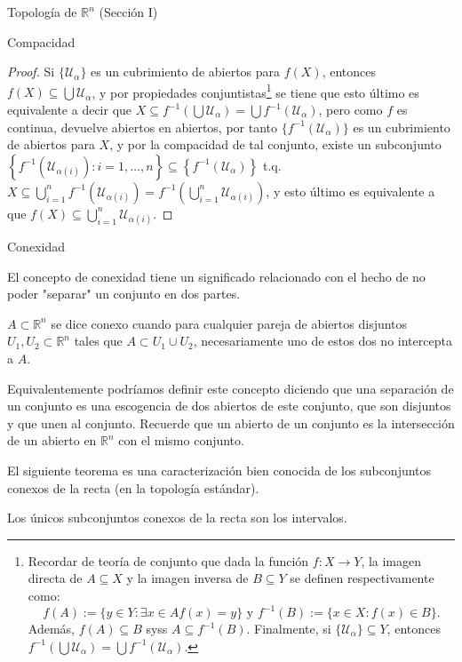 \begin{chapter}{Topología de $\mathbb{R}^n$ (Sección I)}
\begin{section}{Compacidad}
\begin{proof}
Si $\{\mathcal{U}_\alpha\}$ es un cubrimiento de abiertos para $f(X)$, entonces $f(X)\subseteq\bigcup\mathcal{U}_\alpha$, y por propiedades conjuntistas\footnote{Recordar de teoría de conjunto que dada la función $f:X\to Y$, la imagen directa de $A\subseteq X$ y la imagen inversa de $B\subseteq Y$ se definen respectivamente como:$$f(A):=\{y\in Y:\exists x\in A f(x)=y\}\text{ y }f^{-1}(B):=\{x\in X:f(x)\in B\}.$$ Además, $f(A)\subseteq B$ syss $A\subseteq f^{-1}(B)$. Finalmente, si $\{\mathcal{U}_\alpha\}\subseteq Y$, entonces $f^{-1}\left(\bigcup\mathcal{U}_\alpha\right)=\bigcup f^{-1}\left(\mathcal{U}_\alpha\right)$.} se tiene que esto último es equivalente a decir que $X\subseteq f^{-1}\left(\bigcup\mathcal{U}_\alpha\right)=\bigcup f^{-1}(\mathcal{U}_\alpha)$, pero como $f$ es continua, devuelve abiertos en abiertos, por tanto $\{f^{-1}(\mathcal{U}_\alpha)\}$ es un cubrimiento de abiertos para $X$, y por la compacidad de tal conjunto, existe un subconjunto $\left\lbrace f^{-1}(\mathcal{U}_{\alpha(i)}):i=1,\ldots,n\right\rbrace\subseteq\left\lbrace f^{-1}\left(\mathcal{U}_\alpha\right)\right\rbrace$ t.q. $X\subseteq\bigcup_{i=1}^nf^{-1}\left(\mathcal{U}_{\alpha(i)}\right)=f^{-1}\left(\bigcup_{i=1}^n\mathcal{U}_{\alpha(i)}\right)$, y esto último es equivalente a que $f(X)\subseteq\bigcup_{i=1}^n\mathcal{U}_{\alpha(i)}$.
\end{proof}

\end{section}

\begin{section}{Conexidad}

El concepto de conexidad tiene un significado relacionado con el hecho de no poder "separar" un conjunto en dos partes.

\begin{defn}
$A \subset \mathbb{R}^n$ se dice conexo cuando para cualquier pareja de abiertos disjuntos $U_1, U_2 \subset \mathbb{R}^n$ tales que $A \subset U_1 \cup U_2$, necesariamente uno de estos dos no intercepta a $A$.
\end{defn}
Equivalentemente podríamos definir este concepto diciendo que una separación de un conjunto es una escogencia de dos abiertos de este conjunto, que son disjuntos y que unen al conjunto. Recuerde que un abierto de un conjunto es la intersección de un abierto en $\mathbb{R}^n$ con el mismo conjunto.

El siguiente teorema es una caracterización bien conocida de los subconjuntos conexos de la recta (en la topología estándar).

\begin{them}
Los únicos subconjuntos conexos de la recta son los intervalos.
\end{them}
\end{section}
\end{chapter}

